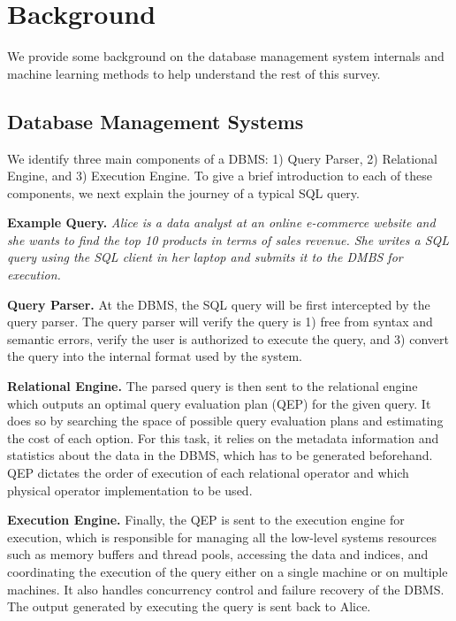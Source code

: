\section{Background}
We provide some background on the database management system internals and machine learning methods to help understand the rest of this survey.

\subsection{Database Management Systems}
We identify three main components of a DBMS: 1) Query Parser, 2) Relational Engine, and 3) Execution Engine.
To give a brief introduction to each of these components, we next explain the journey of a typical SQL query.

\vspace{2mm}
\noindent \textbf{Example Query.} \textit{Alice is a data analyst at an online e-commerce website and she wants to find the top 10 products in terms of sales revenue.
She writes a SQL query using the SQL client in her laptop and submits it to the DMBS for execution.}

\vspace{2mm}
\noindent \textbf{Query Parser.} At the DBMS, the SQL query will be first intercepted by the query parser.
The query parser will verify the query is 1) free from syntax and semantic errors, verify the user is authorized to execute the query, and 3) convert the query into the internal format used by the system.

\vspace{2mm}
\noindent \textbf{Relational Engine.} The parsed query is then sent to the relational engine which outputs an optimal query evaluation plan (QEP) for the given query.
It does so by searching the space of possible query evaluation plans and estimating the cost of each option.
For this task, it relies on the metadata information and statistics about the data in the DBMS, which has to be generated beforehand.
QEP dictates the order of execution of each relational operator and which physical operator implementation to be used.

\vspace{2mm}
\noindent \textbf{Execution Engine.} Finally, the QEP is sent to the execution engine for execution, which is responsible for managing all the low-level systems resources such as memory buffers and thread pools, accessing the data and indices, and coordinating the execution of the query either on a single machine or on multiple machines.
It also handles concurrency control and failure recovery of the DBMS.
The output generated by executing the query is sent back to Alice.


